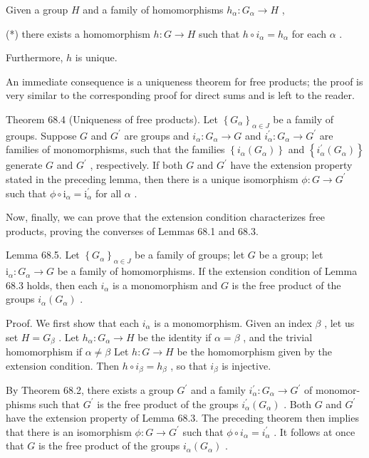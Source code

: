 \documentclass[10pt]{article}
\begin{document}
Given a group \(H\) and a family of homomorphisms \({h}_{\alpha } : {G}_{\alpha } \rightarrow  H\) ,

(*) there exists a homomorphism \(h : G \rightarrow  H\) such that \(h \circ  {i}_{\alpha } = {h}_{\alpha }\) for each \(\alpha\) .

Furthermore, \(h\) is unique.

An immediate consequence is a uniqueness theorem for free products; the proof is very similar to the corresponding proof for direct sums and is left to the reader.

Theorem 68.4 (Uniqueness of free products). Let \({\left\{  {G}_{\alpha }\right\}  }_{\alpha  \in  J}\) be a family of groups. Suppose \(G\) and \({G}^{\prime }\) are groups and \({i}_{\alpha } : {G}_{\alpha } \rightarrow  G\) and \({i}_{\alpha }^{\prime } : {G}_{\alpha } \rightarrow  {G}^{\prime }\) are families of monomorphisms, such that the families \(\left\{  {{i}_{\alpha }\left( {G}_{\alpha }\right) }\right\}\) and \(\left\{  {{i}_{\alpha }^{\prime }\left( {G}_{\alpha }\right) }\right\}\) generate \(G\) and \({G}^{\prime }\) , respectively. If both \(G\) and \({G}^{\prime }\) have the extension property stated in the preceding lemma, then there is a unique isomorphism \(\phi  : G \rightarrow  {G}^{\prime }\) such that \(\phi  \circ  {\mathrm{i}}_{\alpha } = {\mathrm{i}}_{\alpha }^{\prime }\) for all \(\alpha\) .

Now, finally, we can prove that the extension condition characterizes free products, proving the converses of Lemmas 68.1 and 68.3.

Lemma 68.5. Let \({\left\{  {G}_{\alpha }\right\}  }_{\alpha  \in  J}\) be a family of groups; let \(G\) be a group; let \({\mathrm{i}}_{\alpha } : {G}_{\alpha } \rightarrow  G\) be a family of homomorphisms. If the extension condition of Lemma 68.3 holds, then each \({i}_{\alpha }\) is a monomorphism and \(G\) is the free product of the groups \({i}_{\alpha }\left( {G}_{\alpha }\right)\) .

Proof. We first show that each \({i}_{\alpha }\) is a monomorphism. Given an index \(\beta\) , let us set \(H = {G}_{\beta }\) . Let \({h}_{\alpha } : {G}_{\alpha } \rightarrow  H\) be the identity if \(\alpha  = \beta\) , and the trivial homomorphism if \(\alpha  \neq  \beta\) Let \(h : G \rightarrow  H\) be the homomorphism given by the extension condition. Then \(h \circ  {i}_{\beta } = {h}_{\beta }\) , so that \({i}_{\beta }\) is injective.

By Theorem 68.2, there exists a group \({G}^{\prime }\) and a family \({i}_{\alpha }^{\prime } : {G}_{\alpha } \rightarrow  {G}^{\prime }\) of monomor-phisms such that \({G}^{\prime }\) is the free product of the groups \({i}_{\alpha }^{\prime }\left( {G}_{\alpha }\right)\) . Both \(G\) and \({G}^{\prime }\) have the extension property of Lemma 68.3. The preceding theorem then implies that there is an isomorphism \(\phi  : G \rightarrow  {G}^{\prime }\) such that \(\phi  \circ  {i}_{\alpha } = {i}_{\alpha }^{\prime }\) . It follows at once that \(G\) is the free product of the groups \({i}_{\alpha }\left( {G}_{\alpha }\right)\) .
\end{document}

